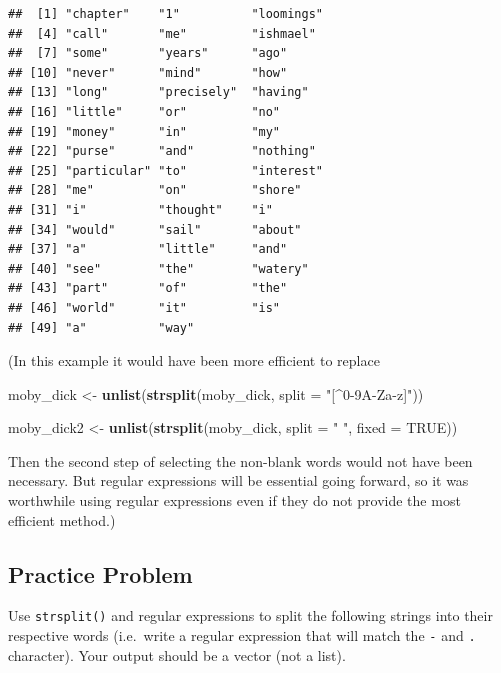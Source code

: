 \documentclass[
]{krantz}
\newenvironment{Shaded}{\begin{snugshade}}{\end{snugshade}}
\newcommand{\DataTypeTok}[1]{\textcolor[rgb]{0.13,0.29,0.53}{#1}}
\newcommand{\KeywordTok}[1]{\textcolor[rgb]{0.13,0.29,0.53}{\textbf{#1}}}
\newcommand{\NormalTok}[1]{#1}
\newcommand{\OtherTok}[1]{\textcolor[rgb]{0.56,0.35,0.01}{#1}}
\newcommand{\StringTok}[1]{\textcolor[rgb]{0.31,0.60,0.02}{#1}}
\begin{document}
\begin{verbatim}
##  [1] "chapter"    "1"          "loomings"  
##  [4] "call"       "me"         "ishmael"   
##  [7] "some"       "years"      "ago"       
## [10] "never"      "mind"       "how"       
## [13] "long"       "precisely"  "having"    
## [16] "little"     "or"         "no"        
## [19] "money"      "in"         "my"        
## [22] "purse"      "and"        "nothing"   
## [25] "particular" "to"         "interest"  
## [28] "me"         "on"         "shore"     
## [31] "i"          "thought"    "i"         
## [34] "would"      "sail"       "about"     
## [37] "a"          "little"     "and"       
## [40] "see"        "the"        "watery"    
## [43] "part"       "of"         "the"       
## [46] "world"      "it"         "is"        
## [49] "a"          "way"
\end{verbatim}

(In this example it would have been more efficient to replace

\begin{Shaded}
\begin{Highlighting}[]
\NormalTok{moby\_dick \textless{}{-}}\StringTok{ }\KeywordTok{unlist}\NormalTok{(}\KeywordTok{strsplit}\NormalTok{(moby\_dick, }\DataTypeTok{split =} \StringTok{"[\^{}0{-}9A{-}Za{-}z]"}\NormalTok{))}
\end{Highlighting}
\end{Shaded}

\begin{Shaded}
\begin{Highlighting}[]
\NormalTok{moby\_dick2 \textless{}{-}}\StringTok{ }\KeywordTok{unlist}\NormalTok{(}\KeywordTok{strsplit}\NormalTok{(moby\_dick, }\DataTypeTok{split =} \StringTok{" "}\NormalTok{, }\DataTypeTok{fixed =} \OtherTok{TRUE}\NormalTok{))}
\end{Highlighting}
\end{Shaded}

Then the second step of selecting the non-blank words would not have been necessary. But regular expressions will be essential going forward, so it was worthwhile using regular expressions even if they do not provide the most efficient method.)

\hypertarget{textPP1}{%
\subsection{Practice Problem}\label{textPP1}}

Use \texttt{strsplit()} and regular expressions to split the following strings into their respective words (i.e.~write a regular expression that will match the \texttt{-} and \texttt{.} character). Your output should be a vector (not a list).
\end{document}
